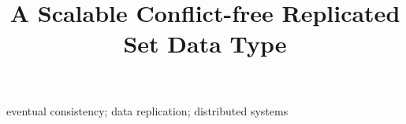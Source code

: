 \documentclass[10pt,conference,letterpaper]{IEEEtran}
\begin{document}
\title{A Scalable Conflict-free Replicated Set Data Type}

\author{
\and
{}
}

\maketitle


\begin{IEEEkeywords}
eventual consistency; data replication; distributed systems
\end{IEEEkeywords}























\end{document}
